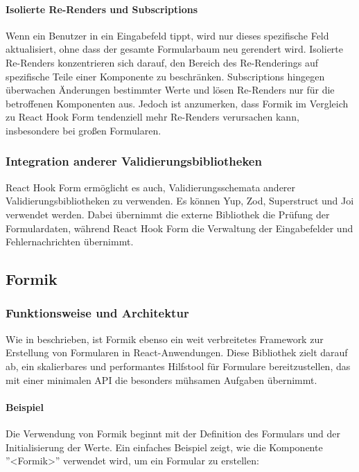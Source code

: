             \paragraph{Isolierte Re-Renders und Subscriptions}
            Wenn ein Benutzer in ein Eingabefeld tippt, wird nur dieses spezifische Feld aktualisiert, ohne dass der gesamte Formularbaum neu gerendert wird. Isolierte Re-Renders konzentrieren sich darauf, den Bereich des Re-Renderings auf spezifische Teile einer Komponente zu beschränken. Subscriptions hingegen überwachen Änderungen bestimmter Werte und lösen Re-Renders nur für die betroffenen Komponenten aus. Jedoch ist anzumerken, dass Formik im Vergleich zu React Hook Form tendenziell mehr Re-Renders verursachen kann, insbesondere bei großen Formularen. \cite{prompt13_pollak} \cite{prompt14_pollak}
                
        \subsubsection{Integration anderer Validierungsbibliotheken}
        \label{sec:IntegrationReactHookForm}
        React Hook Form ermöglicht es auch, Validierungsschemata anderer Validierungsbibliotheken zu verwenden. Es können Yup, Zod, Superstruct und Joi verwendet werden. Dabei übernimmt die externe Bibliothek die Prüfung der Formulardaten, während React Hook Form die Verwaltung der Eingabefelder und Fehlernachrichten übernimmt. \cite{prompt11_pollak}
        
    \subsection{Formik}
       \subsubsection{Funktionsweise und Architektur} 
        Wie in \cite{formik} beschrieben, ist Formik ebenso ein weit verbreitetes Framework zur Erstellung von Formularen in React-Anwendungen. Diese Bibliothek zielt darauf ab, ein skalierbares und performantes Hilfstool für Formulare bereitzustellen, das mit einer minimalen API die besonders mühsamen Aufgaben übernimmt.
        
        \paragraph{Beispiel}
        Die Verwendung von Formik beginnt mit der Definition des Formulars und der Initialisierung der Werte. Ein einfaches Beispiel zeigt, wie die Komponente ''<Formik>'' verwendet wird, um ein Formular zu erstellen:
        
